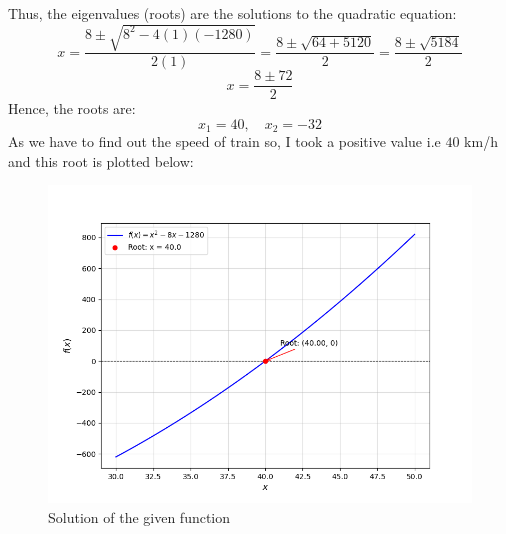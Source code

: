 \documentclass[journal]{IEEEtran}
\begin{document}
Thus, the eigenvalues (roots) are the solutions to the quadratic equation:
\[
x = \frac{8 \pm \sqrt{8^2 - 4(1)(-1280)}}{2(1)} = \frac{8 \pm \sqrt{64 + 5120}}{2} = \frac{8 \pm \sqrt{5184}}{2}
\]
\[
x = \frac{8 \pm 72}{2}
\]
Hence, the roots are:
\[
x_1 = 40, \quad x_2 = -32
\]
As we have to find out the speed of train so, I took a positive value i.e $40$ km/h and this root is plotted below:
\begin{figure}[!ht]
		\centering
		\includegraphics[width=\columnwidth]{figs/Figure_1.png}
		\caption{Solution of the given function}
		\label{stemplot}
	\end{figure}
\end{document}
